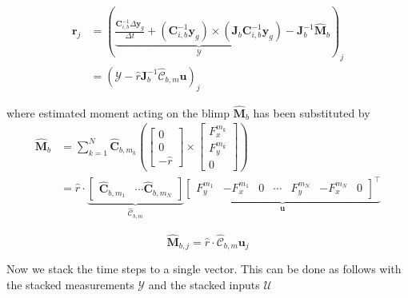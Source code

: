 \begin{equation}
\label{eqn_objective_short}
\begin{aligned}
\mathbf{r}_j &= \left(
\underbrace{
\frac{\mathbf{C}_{i,b}^{-1} \Delta \mathbf{y}_g}{\Delta t} + \left( \mathbf{C}_{i,b}^{-1} \mathbf{y}_g \right) \times \left(\mathbf{J}_b \mathbf{C}_{i,b}^{-1} \mathbf{y}_g \right)}_\mathcal{Y}
 - \mathbf{J}_b^{-1} \hat{\mathbf{M}}_b \right)_j \\
 &= \left( \mathcal{Y} - \hat{r} \mathbf{J}_b^{-1} \hat{\mathcal{C}}_{b,m} \mathbf{u} \right)_j
\end{aligned}
\end{equation}

where estimated moment acting on the blimp $\hat{\mathbf{M}}_b$ has been substituted by
\begin{equation}
\label{eqn_est_moment_reduction}
\begin{aligned}
\hat{\mathbf{M}}_b &= \sum_{k=1}^N { \hat{\mathbf{C}}_{b,m_k} \left(
\left[ \begin{array}{c}
0 \\ 0 \\ - \hat{r}
\end{array} \right]
\times 
\left[ \begin{array}{c}
F^{m_k}_x \\ F^{m_k}_y \\ 0
\end{array} \right]
\right)} \\
&= \hat{r} \cdot \underbrace{ \left[
\begin{array}{ccc}
\hat{\mathbf{C}}_{b,m_1} & \cdots \hat{\mathbf{C}}_{b,m_N}
\end{array}
\right] }_{\hat{\mathcal{C}}_{b,m}}
\underbrace{ \left[
\begin{array}{ccccccc}
 F^{m_1}_y & - F^{m_1}_x & 0 & \cdots &F^{m_N}_y & -  F^{m_N}_x & 0 
\end{array}
\right]^\top }_{\mathbf{u}}
\end{aligned}
\end{equation}

\begin{equation}
\hat{\mathbf{M}}_{b,j} = \hat{r} \cdot \hat{\mathcal{C}}_{b,m} \mathbf{u}_j
\end{equation}

Now we stack the time steps to a single vector. This can be done as follows with the stacked measurements $\mathcal{Y}$ and the stacked inputs $\mathcal{U}$

